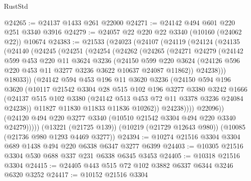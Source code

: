 \begin{lexlean}{RustStd}
\begin{coremodule}
@24265 := @24137 @1433 @261 @22000
@24271 := @24142 @494 @601 @220 @251 @3340 @3916
@24279 := @24057 @22 @220 @22 @3340 (@10160 (@24062 @22)) @10674
@24383 := @21533
    (@24023
      (@24107
        (@24119
          (@24124
            (@24135
              (@24140
                (@24245
                  (@24251
                    (@24254
                      (@24262
                        (@24265
                          (@24271
                            @24279
                            (@24142
                              @599
                              @453
                              @220
                              @11
                              @3624
                              @3236
                              (@24150
                                @599
                                @220
                                @3624
                                (@24126 @596 @220 @453 @11 @3277 @3236 @3622 @10637 @24087 @11862))
                              @24238)))
                        @18033))
                    (@24142
                      @594
                      @453
                      @196
                      @11
                      @3620
                      @3236
                      (@24150
                        @594
                        @196
                        @3620
                        (@10117
                          @21542
                          @3304
                          @28
                          @515
                          @102
                          @196
                          @3277
                          @3380
                          @3242
                          @1666
                          (@24137
                            @515
                            @102
                            @3380
                            (@24142 @513 @453 @72 @11 @3378 @3236 @24084 @24238))
                          @11827
                          @11830
                          @11833
                          @11836
                          @10262))
                      @24238))))
              @22096))
          (@24120 @494 @220 @3277 @3340 (@10510 @21542 @3304 @494 @220 @3340 @24279)))))
    (@13221 (@21725 @139))
    (@10219 (@21729 @12643 @980))
    (@10085 (@21736 @980 @1293 @4469 @3277))
@24394 := @10274 @21516 @3304 @3304 @689 @1438 @494 @220 @6338 @6347 @3277 @6399
@24403 := @10305 @21516 @3304 @530 @688 @337 @231 @6338 @6345 @3453
@24405 := @10318 @21516 @3304
@24415 := @24405 @443 @515 @72 @102 @3882 @6337 @6344 @3246 @6320 @3252
@24417 := @10152 @21516 @3304

\end{coremodule}
\end{lexlean}

